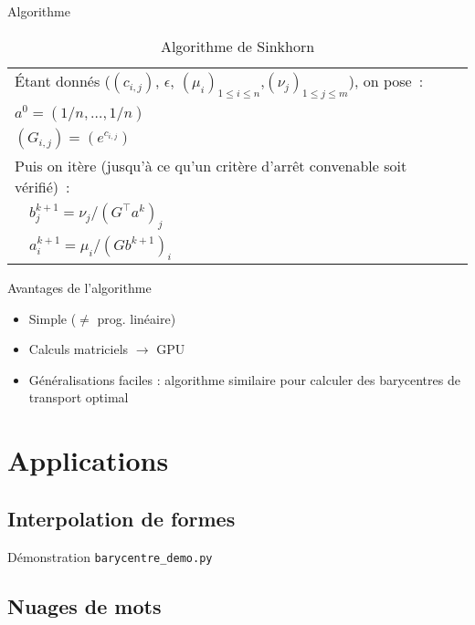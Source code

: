\documentclass{beamer}
\newcommand{\transpose}{\intercal}
\begin{document}
\begin{frame}{Algorithme}
\begin{table}[h!]
\centering
\caption*{Algorithme de Sinkhorn}
\label{algorithme}
\begin{tabular}{|l|}
\hline
\'Etant donnés ($(c_{i,j})$, $\epsilon$, $(\mu_i)_{1\le i \le n}$,$(\nu_j)_{1 \le j \le m}$), on pose~: \\
$a^0 = (1/n, \ldots, 1/n)$\\
$(G_{i,j}) = (e^{c_{i,j}})$\\
Puis on itère (jusqu'à ce qu'un critère d'arrêt convenable soit vérifié)~: \\
$\quad b^{k+1}_j = \nu_j / (G^\transpose a^k)_j$\\
$\quad a^{k+1}_i = \mu_i /(G b^{k+1})_i$ \\
\hline
\end{tabular}
\end{table}
\end{frame}

\begin{frame}{Avantages de l'algorithme}
\begin{itemize}
\item Simple ($\ne$ prog. linéaire)
\item Calculs matriciels $\rightarrow$ GPU
\item Généralisations faciles : algorithme similaire pour calculer des barycentres de transport optimal
\end{itemize}
\end{frame}

\section{Applications}

\subsection{Interpolation de formes}

\begin{frame}{Démonstration}
\texttt{barycentre\_demo.py}
\end{frame}

\subsection{Nuages de mots}
\end{document}
